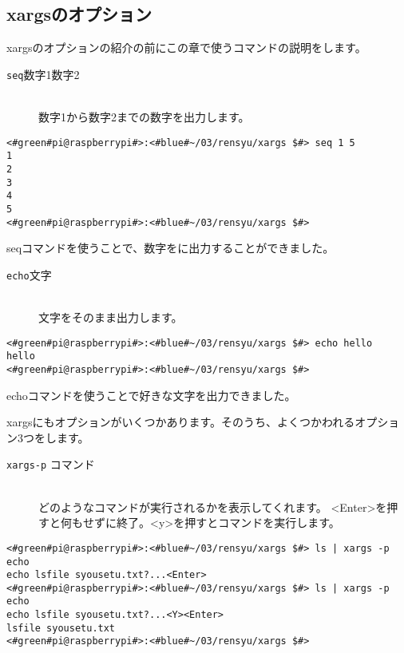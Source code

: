 \subsection{xargsのオプション}
xargsのオプションの紹介の前にこの章で使うコマンドの説明をします。
\begin{description}
    \item[\texttt{seq}\textvisiblespace 数字1\textvisiblespace 数字2]\mbox{}\\
    数字1から数字2までの数字を出力します。
\end{description}

\begin{lstlisting}[caption=seqコマンド]
<#green#pi@raspberrypi#>:<#blue#~/03/rensyu/xargs $#> seq 1 5
1
2
3
4
5
<#green#pi@raspberrypi#>:<#blue#~/03/rensyu/xargs $#>
\end{lstlisting}
seqコマンドを使うことで、数字をに出力することができました。

\begin{description}
    \item[\texttt{echo}\textvisiblespace 文字]\mbox{}\\
    文字をそのまま出力します。
\end{description}

\begin{lstlisting}[caption=seqコマンド]
<#green#pi@raspberrypi#>:<#blue#~/03/rensyu/xargs $#> echo hello
hello
<#green#pi@raspberrypi#>:<#blue#~/03/rensyu/xargs $#>
\end{lstlisting}
echoコマンドを使うことで好きな文字を出力できました。

xargsにもオプションがいくつかあります。そのうち、よくつかわれるオプション3つをします。

\begin{description}
    \item[\texttt{xargs}\textvisiblespace \texttt{-p}\textvisiblespace
                コマンド]\mbox{}\\
    どのようなコマンドが実行されるかを表示してくれます。
    <Enter>を押すと何もせずに終了。<y>を押すとコマンドを実行します。
\end{description}

\begin{lstlisting}[caption=xargsコマンドのオプションp]
<#green#pi@raspberrypi#>:<#blue#~/03/rensyu/xargs $#> ls | xargs -p echo
echo lsfile syousetu.txt?...<Enter>
<#green#pi@raspberrypi#>:<#blue#~/03/rensyu/xargs $#> ls | xargs -p echo
echo lsfile syousetu.txt?...<Y><Enter>
lsfile syousetu.txt
<#green#pi@raspberrypi#>:<#blue#~/03/rensyu/xargs $#>
\end{lstlisting}

